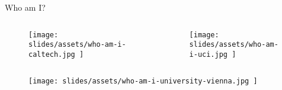 \begin{frame}{Who am I?}
\begin{columns}
\begin{column}[T]{0.3\textwidth}
\begin{columns}
\begin{column}[T, onlytextwidth]{0.5\textwidth}
        \begin{figure}
          \texttt{[image: 
            slides/assets/who-am-i-caltech.jpg
          ]}
        \end{figure}
      \end{column}

      \begin{column}[T, onlytextwidth]{0.5\textwidth}%

        \begin{figure}
          \texttt{[image: 
            slides/assets/who-am-i-uci.jpg
          ]}
        \end{figure}

      \end{column}

    \end{columns}

    \begin{figure}
      \texttt{[image: 
        slides/assets/who-am-i-university-vienna.jpg
      ]}
    \end{figure}
  
  \end{column}

\end{columns}

\end{frame}
